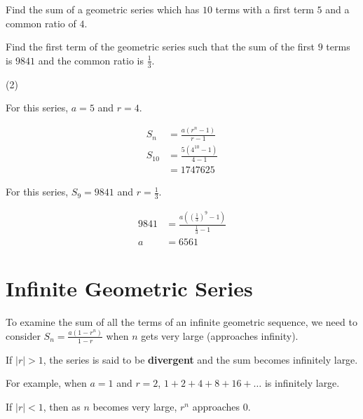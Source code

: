 \documentclass[11pt,a4paper]{book}
\begin{document}
\begin{example}

\begin{tasks}[label=(\alph*),label-width=3.5ex] 

\task  Find the sum of a geometric series which has $10$ terms with a first term $5$ and a common ratio of $4$.

\task  Find the first term of the geometric series such that the
sum of the first $9$ terms is $9841$ and the common ratio is ${\displaystyle \frac{1}{3}}$.

\end{tasks}

\Solution

\begin{tasks}[label=(\alph*),label-width=3.5ex](2)

\task For this series, $a=5$ and $r=4$.

\begin{align*}
S_{n} & =\frac{a\left(r^{n}-1\right)}{r-1}\\
S_{10} & =\frac{5\left(4^{10}-1\right)}{4-1}\\
 & =1747625
\end{align*}

\task  For this series, $S_{9}=9841$ and ${\displaystyle r=\frac{1}{3}}$. 

\begin{align*}
9841 & =\frac{a\left(\left(\frac{1}{3}\right)^{9}-1\right)}{\frac{1}{3}-1}\\
a & =6561
\end{align*}

\end{tasks}

\end{example}


\section{Infinite Geometric Series}

To examine the sum of all the terms of an infinite geometric sequence, we need to consider ${\displaystyle S_{n}=\frac{a\left(1-r^{n}\right)}{1-r}}$ when $n$ gets very large (approaches infinity).

If $\left|r\right|>1$, the series is said to be \textbf{divergent}
and the sum becomes infinitely large.

For example, when $a=1$ and $r=2$, $1+2+4+8+16+\ldots$ is infinitely large.

If $\left|r\right|<1$, then as $n$ becomes very large, $r^{n}$
approaches $0$. 
\end{document}
